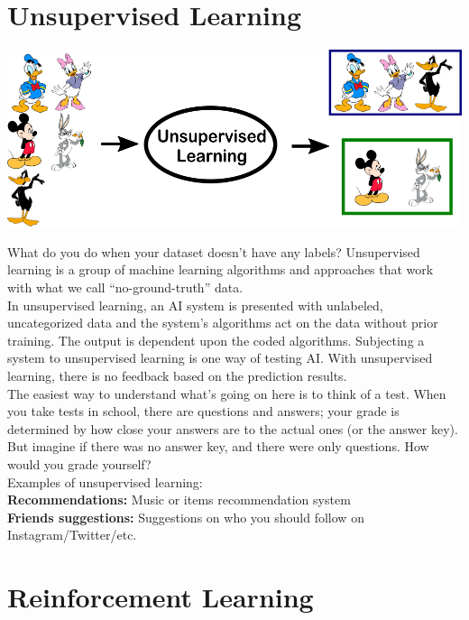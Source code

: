 \documentclass{42-en}
\begin{document}
\section*{Unsupervised Learning}

\centerline{\includegraphics[width=150mm]{images/unsupervised.png}}

What do you do when your dataset doesn't have any labels? Unsupervised learning is a group of machine learning algorithms and approaches that work with what we call “no-ground-truth” data.\\
In unsupervised learning, an AI system is presented with unlabeled, uncategorized data and the system’s algorithms act on the data without prior training. The output is dependent upon the coded algorithms. Subjecting a system to unsupervised learning is one way of testing AI. With unsupervised learning, there is no feedback based on the prediction results.\\
The easiest way to understand what’s going on here is to think of a test. When you take tests in school, there are questions and answers; your grade is determined by how close your answers are to the actual ones (or the answer key). But imagine if there was no answer key, and there were only questions. How would you grade yourself?\\
Examples of unsupervised learning:\\
\textbf{Recommendations:} Music or items recommendation system\\
\textbf{Friends suggestions:} Suggestions on who you should follow on Instagram/Twitter/etc.

\section*{Reinforcement Learning}
\end{document}
